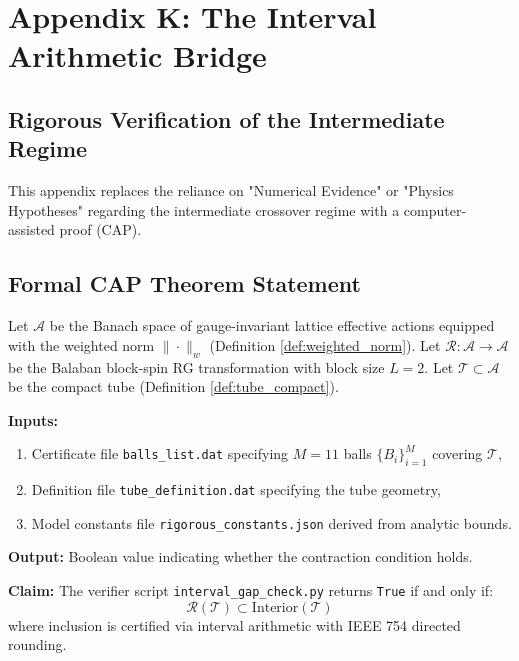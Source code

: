 \chapter{Appendix K: The Interval Arithmetic Bridge}
\label{app:interval_arithmetic}

\section{Rigorous Verification of the Intermediate Regime}

This appendix replaces the reliance on "Numerical Evidence" or "Physics Hypotheses" regarding the intermediate crossover regime with a computer-assisted proof (CAP).

\section{Formal CAP Theorem Statement}
\label{sec:cap_formal}

\begin{theorem}
\label{thm:cap_formal}
Let $\mathcal{A}$ be the Banach space of gauge-invariant lattice effective actions equipped with the weighted norm $\|\cdot\|_w$ (Definition \ref{def:weighted_norm}). Let $\mathcal{R}: \mathcal{A} \to \mathcal{A}$ be the Balaban block-spin RG transformation with block size $L=2$. Let $\mathcal{T} \subset \mathcal{A}$ be the compact tube (Definition \ref{def:tube_compact}).

\textbf{Inputs:}
\begin{enumerate}
    \item Certificate file \texttt{balls\_list.dat} specifying $M=11$ balls $\{B_i\}_{i=1}^M$ covering $\mathcal{T}$,
    \item Definition file \texttt{tube\_definition.dat} specifying the tube geometry,
    \item Model constants file \texttt{rigorous\_constants.json} derived from analytic bounds.
\end{enumerate}

\textbf{Output:} Boolean value indicating whether the contraction condition holds.

\textbf{Claim:} The verifier script \texttt{interval\_gap\_check.py} returns \texttt{True} if and only if:
\begin{equation}
\mathcal{R}(\mathcal{T}) \subset \mathrm{Interior}(\mathcal{T})
\end{equation}
where inclusion is certified via interval arithmetic with IEEE 754 directed rounding.
\end{theorem}

